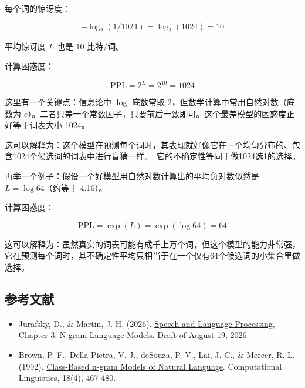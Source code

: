 每个词的惊讶度：

\[
-\log_2(1/1024)=\log_2(1024)=10
\]

平均惊讶度 \(L\) 也是 10 比特/词。

计算困惑度：

\[
\mathrm{PPL}=2^L=2^{10}=1024
\]

这里有一个关键点：信息论中 \(\log\) 底数常取 2，但数学计算中常用自然对数（底数为 \(e\)）。二者只差一个常数因子，只要前后一致即可。这个最差模型的困惑度正好等于词表大小 1024。

这可以解释为：这个模型在预测每个词时，其表现就好像它在一个均匀分布的、包含1024个候选词的词表中进行盲猜一样。~它的不确定性等同于做1024选1的选择。

再举一个例子：假设一个好模型用自然对数计算出的平均负对数似然是 \(L=\log 64\)（约等于 4.16）。

计算困惑度：

\[
\mathrm{PPL}=\exp(L)=\exp(\log 64)=64
\]

这可以解释为：虽然真实的词表可能有成千上万个词，但这个模型的能力非常强，它在预测每个词时，其不确定性平均只相当于在一个仅有64个候选词的小集合里做选择。

\FloatBarrier
{}
\hypertarget{ux53c2ux8003ux6587ux732e-108}{%
\subsection{参考文献}\label{ux53c2ux8003ux6587ux732e-108}}

\vspace{0.25em}
\begin{itemize}
\tightlist
\item
  Jurafsky, D., \& Martin, J. H. (2026). \href{https://web.stanford.edu/~jurafsky/slp3/3.pdf}{Speech and Language Processing, Chapter 3: N-gram Language Models}. Draft of August 19, 2026.
\item
  Brown, P. F., Della Pietra, V. J., deSouza, P. V., Lai, J. C., \& Mercer, R. L. (1992). \href{https://aclanthology.org/J92-4003/}{Class-Based n-gram Models of Natural Language}. Computational Linguistics, 18(4), 467-480.
\end{itemize}

\clearpage
